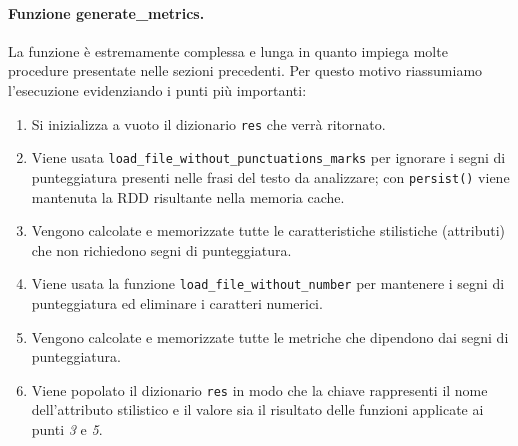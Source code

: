 \documentclass[titlepage]{article}
\begin{document}
\paragraph{Funzione generate\_metrics.}
La funzione è estremamente complessa e lunga in quanto impiega molte procedure presentate nelle sezioni precedenti. Per questo motivo riassumiamo l'esecuzione evidenziando i punti più importanti:
\begin{enumerate}
    \item Si inizializza a vuoto il dizionario \texttt{res} che verrà ritornato.
    \item Viene usata \texttt{load\_file\_without\_punctuations\_marks} per ignorare i segni di punteggiatura presenti nelle frasi del testo da analizzare; con \texttt{persist()} viene mantenuta la RDD risultante nella memoria cache.
    \item Vengono calcolate e memorizzate tutte le caratteristiche stilistiche (attributi) che non richiedono segni di punteggiatura.
    \item Viene usata la funzione \texttt{load\_file\_without\_number} per mantenere i segni di punteggiatura ed eliminare i caratteri numerici.
    \item Vengono calcolate e memorizzate tutte le metriche che dipendono dai segni di punteggiatura.
    \item Viene popolato il dizionario \texttt{res} in modo che la chiave rappresenti il nome dell'attributo stilistico e il valore sia il risultato delle funzioni applicate ai punti \textit{3} e \textit{5}.
\end{enumerate}
\end{document}
